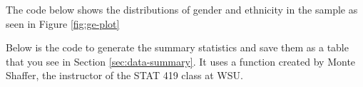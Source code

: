 \documentclass[]{article}
\newenvironment{Shaded}{\begin{snugshade}}{\end{snugshade}}
\newcommand{\DataTypeTok}[1]{\textcolor[rgb]{0.13,0.29,0.53}{#1}}
\newcommand{\KeywordTok}[1]{\textcolor[rgb]{0.13,0.29,0.53}{\textbf{#1}}}
\newcommand{\NormalTok}[1]{#1}
\newcommand{\OperatorTok}[1]{\textcolor[rgb]{0.81,0.36,0.00}{\textbf{#1}}}
\newcommand{\OtherTok}[1]{\textcolor[rgb]{0.56,0.35,0.01}{#1}}
\newcommand{\StringTok}[1]{\textcolor[rgb]{0.31,0.60,0.02}{#1}}
\begin{document}
The code below shows the distributions of gender and ethnicity in the
sample as seen in Figure \ref{fig:ge-plot}

\begin{Shaded}
\end{Shaded}

Below is the code to generate the summary statistics and save them as a
table that you see in Section \ref{sec:data-summary}. It uses a function
created by Monte Shaffer, the instructor of the STAT 419 class at WSU.
\end{document}
